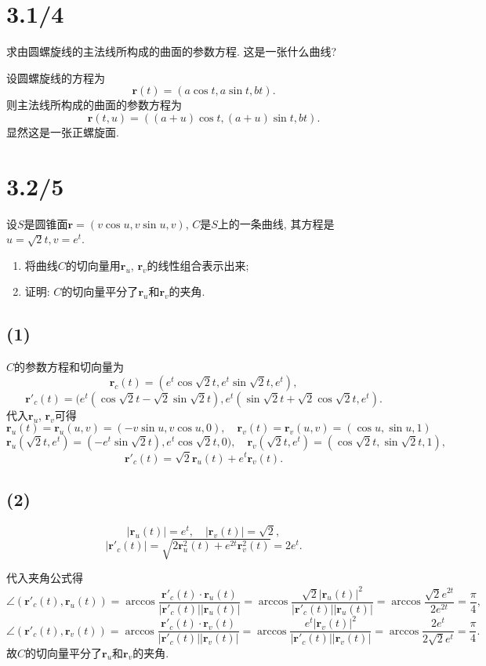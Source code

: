 \documentclass[11pt,a4paper]{article}
\author{刘逸灏 (515370910207)}
\begin{document}
\maketitle

\section{3.1/4}
\begin{problem}
  求由圆螺旋线的主法线所构成的曲面的参数方程. 这是一张什么曲线?
\end{problem}

设圆螺旋线的方程为
$$\mathbf{r}(t)=(a\cos t,a\sin t,bt).$$
则主法线所构成的曲面的参数方程为
$$\mathbf{r}(t,u)=((a+u)\cos t,(a+u)\sin t,bt).$$
显然这是一张正螺旋面.

\section{3.2/5}
\begin{problem}
  设$S$是圆锥面$\mathbf{r}=(v\cos u,v\sin u, v)$, $C$是$S$上的一条曲线, 其方程是$u=\sqrt{2}t,v=e^t$.
  \begin{enumerate}
    \item 将曲线$C$的切向量用$\mathbf{r}_u$, $\mathbf{r}_v$的线性组合表示出来;
    \item 证明: $C$的切向量平分了$\mathbf{r}_u$和$\mathbf{r}_v$的夹角.
  \end{enumerate}
\end{problem}

\subsection*{(1)}
$C$的参数方程和切向量为
$$\mathbf{r}_c(t)=(e^t\cos\sqrt{2}t,e^t\sin\sqrt{2}t,e^t),$$
$$\mathbf{r}'_c(t)=(e^t(\cos\sqrt{2}t-\sqrt{2}\sin\sqrt{2}t),e^t(\sin\sqrt{2}t+\sqrt{2}\cos\sqrt{2}t,e^t).$$
代入$\mathbf{r}_u$, $\mathbf{r}_v$可得
$$\mathbf{r}_u(t)=\mathbf{r}_u(u,v)=(-v\sin u,v\cos u,0),\quad\mathbf{r}_v(t)=\mathbf{r}_v(u,v)=(\cos u,\sin u,1)$$
$$\mathbf{r}_u(\sqrt{2}t,e^t)=(-e^t\sin\sqrt{2}t),e^t\cos\sqrt{2}t,0),\quad \mathbf{r}_v(\sqrt{2}t,e^t)=(\cos\sqrt{2}t,\sin\sqrt{2}t,1),$$
$$\mathbf{r}'_c(t)=\sqrt{2}\mathbf{r}_u(t)+e^t\mathbf{r}_v(t).$$

\subsection*{(2)}
$$|\mathbf{r}_u(t)|=e^t,\quad|\mathbf{r}_v(t)|=\sqrt{2},$$
$$|\mathbf{r}'_c(t)|=\sqrt{2\mathbf{r}^2_u(t)+e^{2t}\mathbf{r}^2_v(t)}=2e^t.$$

代入夹角公式得
$$\angle(\mathbf{r}'_c(t),\mathbf{r}_u(t))=\arccos\frac{\mathbf{r}'_c(t)\cdot\mathbf{r}_u(t)}{|\mathbf{r}'_c(t)||\mathbf{r}_u(t)|}=\arccos\frac{\sqrt{2}|\mathbf{r}_u(t)|^2}{|\mathbf{r}'_c(t)||\mathbf{r}_u(t)|}=\arccos\frac{\sqrt{2}e^{2t}}{2e^{2t}}=\frac{\pi}{4},$$
$$\angle(\mathbf{r}'_c(t),\mathbf{r}_v(t))=\arccos\frac{\mathbf{r}'_c(t)\cdot\mathbf{r}_v(t)}{|\mathbf{r}'_c(t)||\mathbf{r}_v(t)|}=\arccos\frac{e^t|\mathbf{r}_v(t)|^2}{|\mathbf{r}'_c(t)||\mathbf{r}_v(t)|}=\arccos\frac{2e^t}{2\sqrt{2}e^t}=\frac{\pi}{4}.$$
故$C$的切向量平分了$\mathbf{r}_u$和$\mathbf{r}_v$的夹角.
\end{document}
